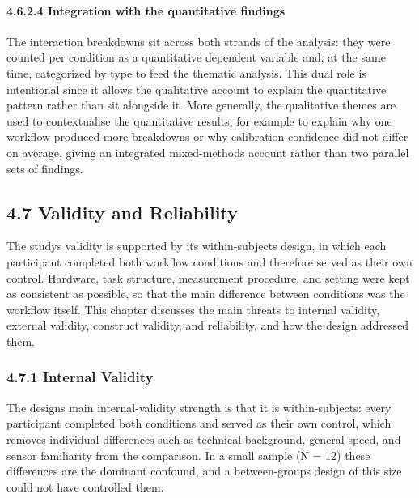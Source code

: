 \documentclass[
]{article}
\begin{document}
\hypertarget{integration-with-the-quantitative-findings}{%
\paragraph{4.6.2.4 Integration with the quantitative findings}\label{integration-with-the-quantitative-findings}}

The interaction breakdowns sit across both strands of the analysis: they were counted per condition as a quantitative dependent variable and, at the same time, categorized by type to feed the thematic analysis. This dual role is intentional since it allows the qualitative account to explain the quantitative pattern rather than sit alongside it. More generally, the qualitative themes are used to contextualise the quantitative results, for example to explain why one workflow produced more breakdowns or why calibration confidence did not differ on average, giving an integrated mixed-methods account rather than two parallel sets of findings.

\hypertarget{validity-and-reliability}{%
\subsection{4.7 Validity and Reliability}\label{validity-and-reliability}}

The study\textquotesingle s validity is supported by its within-subjects design, in which each participant completed both workflow conditions and therefore served as their own control. Hardware, task structure, measurement procedure, and setting were kept as consistent as possible, so that the main difference between conditions was the workflow itself. This chapter discusses the main threats to internal validity, external validity, construct validity, and reliability, and how the design addressed them.

\hypertarget{internal-validity}{%
\subsubsection{4.7.1 Internal Validity}\label{internal-validity}}

The design\textquotesingle s main internal-validity strength is that it is within-subjects: every participant completed both conditions and served as their own control, which removes individual differences such as technical background, general speed, and sensor familiarity from the comparison. In a small sample (N = 12) these differences are the dominant confound, and a between-groups design of this size could not have controlled them.
\end{document}
